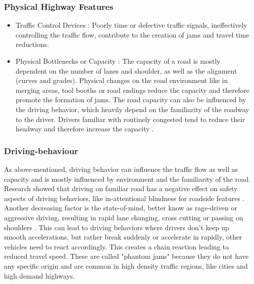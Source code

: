 \documentclass[a4paper,headsepline,footsepline,fontsize=11pt,BCOR=12mm,DIV=12]{report}
\begin{document}
\subsubsection{Physical Highway Features}

\begin{itemize}
	\item Traffic Control Devices : Poorly time or defective traffic signals, ineffectively controlling the traffic flow, contribute to the creation of jams and travel time reductions.
	\item Physical Bottlenecks or Capacity : The capacity of a road is mostly dependent on the number of lanes and shoulder, as well as the alignment (curves and grades). Physical changes on the road environment like in merging areas, tool booths or road endings reduce the capacity and therefore promote the formation of jams. The road capacity can also be influenced by the driving behavior, which heavily depend on the familiarity of the roadway to the driver. Drivers familiar with routinely congested tend to reduce their headway and therefore increase the capacity \cite{Charlton2013}.
\end{itemize}

\subsubsection{Driving-behaviour}
As above-mentioned, driving behavior can influence the traffic flow as well as capacity and is mostly influenced by environment and the familiarity of the road. Research showed that driving on familiar road has a negative effect on safety aspects of driving behaviors, like in-attentional blindness for roadside features \cite{Charlton2013}. Another decreasing factor is the state-of-mind, better know as rage-driven or aggressive driving, resulting in rapid lane changing, cross cutting or passing on shoulders \cite{Shinar2004}. This can lead to driving behaviors where drivers don't keep up smooth accelerations, but rather break suddenly or accelerate in rapidly, other vehicles need to react accordingly. This creates a chain reaction leading to reduced travel speed. These are called "phantom jams" because they do not have any specific origin and are common in high density traffic regions, like cities and high demand highways. \cite{ASTRA2020} 

\bigskip
\end{document}
